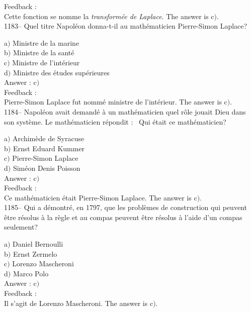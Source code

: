 \documentclass[letterpaper, 12pt]{article}
\begin{document}
Feedback : \\
Cette fonction se nomme la {\sl transform\'ee de Laplace}.
The answer is c$)$.\\

1183-- Quel titre Napol\'eon  donna-t-il au math\'ematicien
Pierre-Simon Laplace?

a$)$ Ministre de la marine \\
b$)$ Ministre de la sant\'e \\
c$)$ Ministre de l'int\'erieur  \\
d$)$ Ministre des \'etudes sup\'erieures\\

Answer : c$)$\\

Feedback : \\
Pierre-Simon Laplace fut nomm\'e ministre de l'int\'erieur.
The answer is c$)$.\\

1184-- Napol\'eon avait demand\'e \`a un math\'ematicien quel r\^ole
jouait Dieu dans son syst\`eme. Le math\'ematicien r\'epondit :
\fg\ Qui
\'etait ce math\'ematicien?

a$)$ Archim\`ede de Syracuse \\
b$)$ Ernst Eduard Kummer \\
c$)$ Pierre-Simon Laplace \\
d$)$ Sim\'eon Denis Poisson\\

Answer : c$)$\\

Feedback : \\
Ce math\'ematicien \'etait Pierre-Simon Laplace.
The answer is c$)$.\\

1185-- Qui a d\'emontr\'e, en 1797, que les probl\`emes de
construction qui peuvent \^etre r\'esolus \`a la r\`egle et au
compas peuvent \^etre r\'esolus \`a l'aide d'un compas seulement?

a$)$ Daniel Bernoulli \\
b$)$ Ernst Zermelo \\
c$)$ Lorenzo Mascheroni \\
d$)$ Marco Polo\\

Answer : c$)$\\

Feedback : \\
Il s'agit de Lorenzo Mascheroni.
The answer is c$)$.\\
\end{document}
